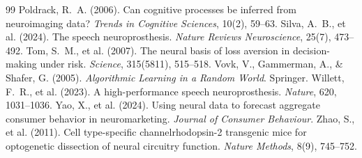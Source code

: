 \documentclass[11pt]{article}
\begin{document}
\begin{thebibliography}{99}
 Poldrack, R.~A. (2006). Can cognitive processes be inferred from neuroimaging data? \emph{Trends in Cognitive Sciences}, 10(2), 59--63.
 Silva, A.~B., et al. (2024). The speech neuroprosthesis. \emph{Nature Reviews Neuroscience}, 25(7), 473--492.
 Tom, S.~M., et al. (2007). The neural basis of loss aversion in decision-making under risk. \emph{Science}, 315(5811), 515--518.
 Vovk, V., Gammerman, A., \& Shafer, G. (2005). \emph{Algorithmic Learning in a Random World}. Springer.
 Willett, F.~R., et al. (2023). A high-performance speech neuroprosthesis. \emph{Nature}, 620, 1031--1036.
 Yao, X., et al. (2024). Using neural data to forecast aggregate consumer behavior in neuromarketing. \emph{Journal of Consumer Behaviour}.
 Zhao, S., et al. (2011). Cell type-specific channelrhodopsin-2 transgenic mice for optogenetic dissection of neural circuitry function. \emph{Nature Methods}, 8(9), 745--752.
\end{thebibliography}
\end{document}
